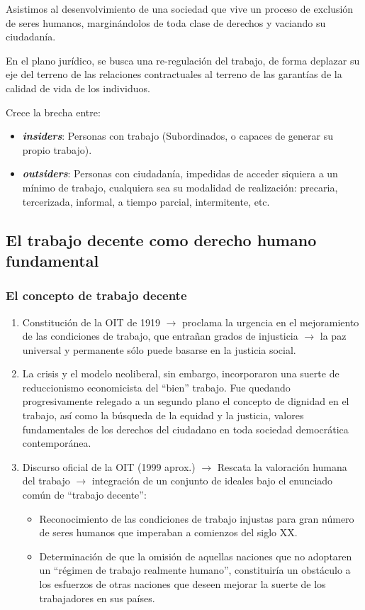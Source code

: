 \documentclass[spanish,12pt,a4paper,titlepage]{report}
\begin{document}
Asistimos al desenvolvimiento de una sociedad que vive un proceso de exclusión de seres humanos, marginándolos de toda clase de derechos y vaciando su ciudadanía.

En el plano jurídico, se busca una re-regulación del trabajo, de forma deplazar su eje del terreno de las relaciones contractuales al terreno de las garantías de la calidad de vida de los individuos.

Crece la brecha entre:
\begin{itemize}
\item \textbf{\textit{insiders}}: Personas con trabajo (Subordinados, o capaces de generar su propio trabajo).
\item \textbf{\textit{outsiders}}: Personas con ciudadanía, impedidas de acceder siquiera a un mínimo de trabajo, cualquiera sea su modalidad de realización: precaria, tercerizada, informal, a tiempo parcial, intermitente, etc.
\end{itemize}

\subsection{El trabajo decente como derecho humano fundamental}
\label{sec:El-trabajo-decente-como-derecho-humano-fundamental}

\subsubsection{El concepto de trabajo decente}
\label{sec:el-concepto-de-trabajo-decente}

\begin{enumerate}
\item Constitución de la OIT de 1919 $\rightarrow$ proclama la urgencia en el mejoramiento de las condiciones de trabajo, que entrañan grados de injusticia $\rightarrow$ la paz universal y permanente sólo puede basarse en la justicia social. 
\item La crisis y el modelo neoliberal, sin embargo, incorporaron una suerte de reduccionismo economicista del “bien” trabajo. Fue quedando progresivamente relegado a un segundo plano el concepto de dignidad en el trabajo, así como la búsqueda de la equidad y la justicia, valores fundamentales de los derechos del ciudadano en toda sociedad democrática contemporánea.
\item Discurso oficial de la OIT (1999 aprox.) $\rightarrow$ Rescata la valoración humana del trabajo $\rightarrow$ integración de un conjunto de ideales bajo el enunciado común de “trabajo decente”:
  \begin{itemize}
  \item Reconocimiento de las condiciones de trabajo injustas para gran número de seres humanos que imperaban a comienzos del siglo XX.
  \item Determinación de que la omisión de aquellas naciones que no adoptaren un “régimen de trabajo realmente humano”, constituiría un obstáculo a los esfuerzos de otras naciones que deseen mejorar la suerte de los trabajadores en sus países. 
  \end{itemize}
\end{enumerate}
\end{document}
